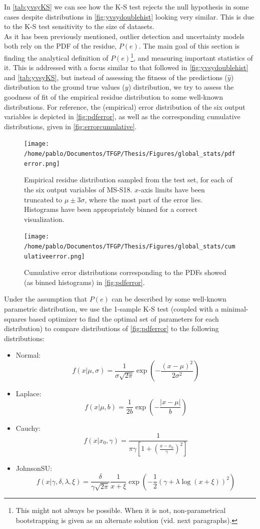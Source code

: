 %
\indent In \autoref{tab:yvsyKS} we can see how the K-S test rejects the null hypothesis in some cases despite distributions in \autoref{fig:yvsydoublehist} looking very similar. This is due to the K-S test sensitivity to the size of datasets.\\
%
\indent As it has been previously mentioned, outlier detection and uncertainty models both rely on the PDF of the residue, $P(e)$. The main goal of this section is finding the analytical definition of $P(e)$\footnote{This might not always be possible. When it is not, non-parametrical bootstrapping is given as an alternate solution (vid. next paragraphs).}, and measuring important statistics of it. This is addressed with a focus similar to that followed in \autoref{fig:yvsydoublehist} and \autoref{tab:yvsyKS}, but instead of assessing the fitness of the predictions ($\hat{y}$) distribution to the ground true values ($y$) distribution, we try to assess the goodness of fit of the empirical residue distribution to some well-known distributions. For reference, the (empirical) error distribution of the six output variables is depicted in \autoref{fig:pdferror}, as well as the corresponding cumulative distributions, given in \autoref{fig:errorcumulative}.\\
\begin{figure}
	\centering
	\texttt{[image: /home/pablo/Documentos/TFGP/Thesis/Figures/global\_stats/pdferror.png]}
	\caption{Empirical residue distribution sampled from the test set, for each of the six output variables of MS-S18. $x$-axis limits have been truncated to $\mu \pm 3 \sigma$, where the most part of the error lies. Histograms have been appropriately binned for a correct visualization.}
	\label{fig:pdferror}
\end{figure}
\begin{figure}
	\centering
	\texttt{[image: /home/pablo/Documentos/TFGP/Thesis/Figures/global\_stats/cumulativeerror.png]}
	\caption{Cumulative error distributions corresponding to the PDFs showed (as binned histograms) in \autoref{fig:pdferror}.}
	\label{fig:errorcumulative}
\end{figure}
%
\indent Under the assumption that $P(e)$ can be described by some well-known parametric distribution, we use the 1-sample K-S test (coupled with a minimal-squares based optimizer to find the optimal set of parameters for each distribution) to compare distributions of \autoref{fig:pdferror} to the following distributions:
\begin{itemize}
	\item Normal:
	\[
	f(x|\mu,\sigma) = \frac{1}{\sigma \sqrt{2\pi}} \exp\left( -\frac{(x-\mu)^2}{2\sigma^2} \right)
	\]
	\item Laplace:
	\[
	f(x|\mu,b) = \frac{1}{2b} \exp\left( -\frac{|x-\mu|}{b} \right)
	\]
	
	\item Cauchy:
	\[
	f(x|x_0,\gamma) = \frac{1}{\pi\gamma \left[1+\left(\frac{x-x_0}{\gamma}\right)^2\right]}
	\]
	
	\item JohnsonSU:
	\[
	f(x|\gamma,\delta,\lambda,\xi) = \frac{\delta}{\gamma\sqrt{2\pi}}\frac{1}{x+\xi} \exp\left(-\frac{1}{2}(\gamma+\lambda \log(x+\xi))^2\right)
	\]
	
\end{itemize}
